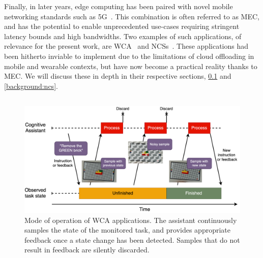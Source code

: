 Finally, in later years, edge computing has been paired with novel mobile networking standards such as 5G~\cite{hassan2019edge,pham2020survey,wan2020efficient}.
This combination is often referred to as \gls{MEC}, and has the potential to enable unprecedented use-cases requiring stringent latency bounds and high bandwidths.
Two examples of such applications, of relevance for the present work, are \acl{WCA}~\cite{ha2014towards,chen2018application,wang2020scaling,chen2017empirical,chen2018application} and \aclp{NCS}~\cite{sasaki2016vehicle,wang2018bandwidth,wan2020efficient}.
These applications had been hitherto inviable to implement due to the limitations of cloud offloading in mobile and wearable contexts, but have now become a practical reality thanks to \gls{MEC}.
We will discuss these in depth in their respective sections, \cref{background:wca} and \cref{background:ncs}.

\subsection{}\label{background:wca}

\begin{figure}
    \centering
    \includegraphics[width=.9\textwidth]{Figs/wca_state}
    \caption{%
        Mode of operation of \acs{WCA} applications.
        The assistant continuously samples the state of the monitored task, and provides appropriate feedback once a state change has been detected.
        Samples that do not result in feedback are silently discarded.
    }\label{fig:wca}
\end{figure}

